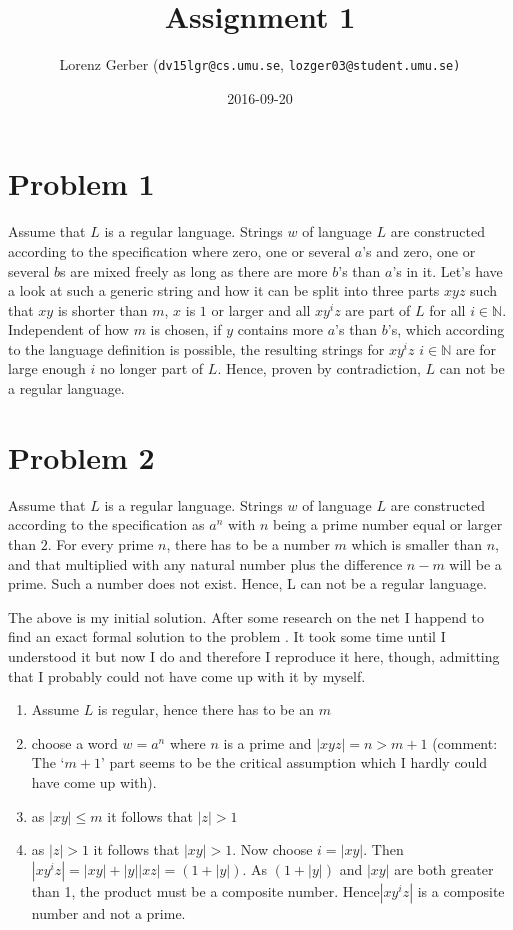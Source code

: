 \documentclass[a4paper,11pt,twoside]{article}
\title{Assignment 1}
\author{Lorenz Gerber ({\tt{dv15lgr@cs.umu.se}}, {\tt{lozger03@student.umu.se})}}
\date{2016-09-20}
\begin{document}
\lstset{language=C}
\maketitle
\thispagestyle{empty}
\newpage

\clearpage
{}

\section*{Problem 1} 
Assume that $L$ is a regular language. Strings $w$ of language $L$ are constructed according to the specification where zero, one or several $a$'s and zero, one or several $b$s are mixed freely as long as there are more $b$'s than $a$'s in it. Let's have a look at such a generic string and how it can be split into three parts $xyz$ such that $xy$ is shorter than $m$, $x$ is $1$ or larger and all $xy^{i}z$ are part of $L$ for all $i \in \mathbb{N}$. Independent of how $m$ is chosen, if $y$ contains more $a$'s than $b$'s, which according to the language definition is possible,  the resulting strings for $xy^{i}z$ $i \in \mathbb{N}$  are for large enough $i$ no longer part of $L$. Hence, proven by contradiction, $L$ can not be a regular language. 

\section*{Problem 2}
Assume that $L$ is a regular language. Strings $w$ of language $L$ are constructed according to the specification as $a^n$ with $n$ being a prime number equal or larger than $2$. For every prime $n$, there has to be a number $m$ which is smaller than $n$, and that multiplied with any natural number plus the difference $n - m$ will be a prime. Such a number does not exist. Hence, L can not be a regular language. 

The above is my initial solution. After some research on the net I
happend to find an exact formal solution to the problem \cite{pumpprime}. It took some
time until I understood it but now I do and therefore I reproduce it
here, though,  admitting that I probably could not have come up with it by
myself. 
 
\begin{enumerate}
\item Assume $L$ is regular, hence there has to be an $m$
\item choose a word $w=a^{n}$ where $n$ is a prime and $|xyz| = n >
  m+1$ (comment: The `$m+1$' part seems to be the critical assumption which I hardly could have come up with).
\item as $|xy| \leqslant m$ it follows that $|z| > 1$
\item as $|z| > 1$ it follows that $|xy| > 1$. Now choose $i =
  |xy|$. Then $|xy^{i}z| = |xy|+|y||xz|=(1+|y|)$. As $(1+|y|)$  and
  $|xy|$ are both greater than 1, the product must be a composite
  number. Hence$|xy^{i}z|$ is a composite number and not a prime.
\end{enumerate}
\end{document}

